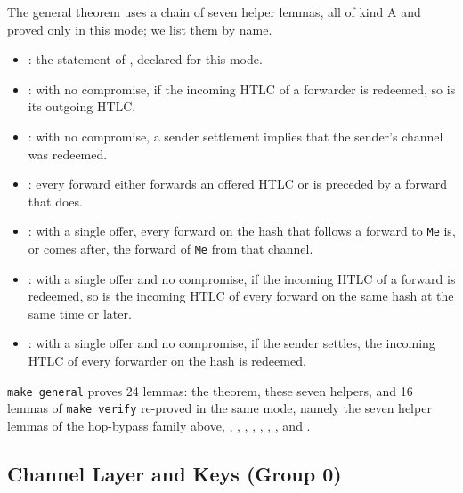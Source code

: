 \noindent The general theorem uses a chain of seven helper lemmas, all of kind A and proved only
in this mode; we list them by name.
{\raggedright
\begin{itemize}
  \item {}: the statement of , declared
    \code{[reuse]} for this mode.
  \item {}: with no compromise, if the incoming HTLC of a forwarder is
    redeemed, so is its outgoing HTLC.
  \item {}: with no compromise, a sender settlement implies that the
    sender's channel was redeemed.
  \item {}: every forward either forwards an offered HTLC or is preceded by a
    forward that does.
  \item {}: with a single offer, every forward on the hash that follows a
    forward to \texttt{Me} is, or comes after, the forward of \texttt{Me} from that channel.
  \item {}: with a single offer and no compromise, if the incoming HTLC of
    a forward is redeemed, so is the incoming HTLC of every forward on the same hash at the same
    time or later.
  \item {}: with a single offer and no compromise, if the
    sender settles, the incoming HTLC of every forwarder on the hash is redeemed.
\end{itemize}
\par}
{\raggedright
\texttt{make general} proves 24 lemmas: the theorem, these seven helpers, and 16 lemmas of
\texttt{make verify} re-proved in the same mode, namely the seven helper lemmas of the hop-bypass
family above, , ,
, , ,
, ,  and
.\par}

\subsection{Channel Layer and Keys (Group 0)}\label{app:channel}

